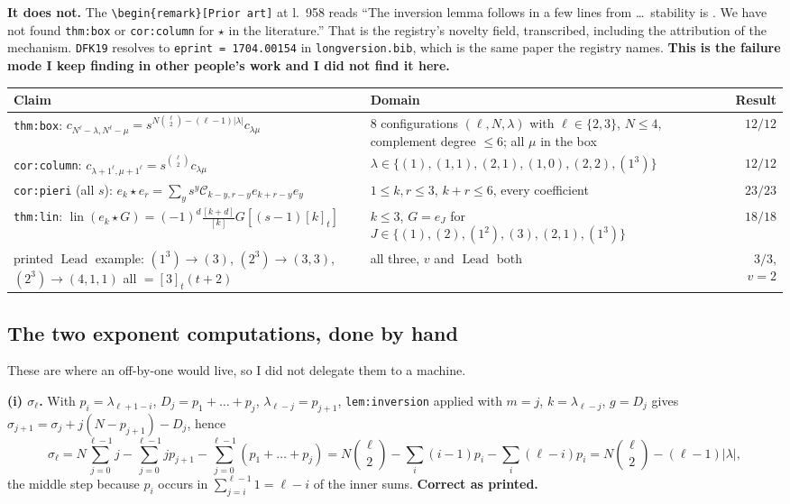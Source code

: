\documentclass[11pt]{article}
\newcommand{\val}{v}
\newcommand{\Lead}{\operatorname{Lead}}
\newcommand{\lin}{\operatorname{lin}}
\begin{document}
\textbf{It does not.} The \verb|\begin{remark}[Prior art]| at l.~958 reads
``The inversion lemma follows in a few lines from \cite[Rem.~3.3]{DFK19} \dots\ stability is
\cite[Prop.~3.8, Cor.~3.10]{Hikita25}. We have not found \texttt{thm:box} or \texttt{cor:column} for
$\star$ in the literature.'' That is the registry's novelty field, transcribed, including the
attribution of the mechanism. \texttt{DFK19} resolves to \texttt{eprint = 1704.00154} in
\texttt{longversion.bib}, which is the same paper the registry names. \textbf{This is the failure mode
I keep finding in other people's work and I did not find it here.}

\begin{center}\small
\begin{tabular}{@{}p{}p{}r@{}}
\toprule
\textbf{Claim} & \textbf{Domain} & \textbf{Result}\\
\midrule
\texttt{thm:box}: $c_{N^\ell-\lambda,N^\ell-\mu}=s^{N\binom\ell2-(\ell-1)|\lambda|}c_{\lambda\mu}$
 & $8$ configurations $(\ell,N,\lambda)$ with $\ell\in\{2,3\}$, $N\le4$, complement degree $\le6$;
   all $\mu$ in the box & $12/12$\\
\texttt{cor:column}: $c_{\lambda+1^\ell,\mu+1^\ell}=s^{\binom\ell2}c_{\lambda\mu}$
 & $\lambda\in\{(1),(1,1),(2,1),(1,0),(2,2),(1^3)\}$ & $12/12$\\
\texttt{cor:pieri} (all $s$): $e_k\star e_r=\sum_ys^y\mathcal C_{k-y,r-y}e_{k+r-y}e_y$
 & $1\le k,r\le3$, $k+r\le6$, every coefficient & $23/23$\\
\texttt{thm:lin}: $\lin(e_k\star G)=(-1)^d\frac{[k+d]}{[k]}G[(s-1)[k]_t]$
 & $k\le3$, $G=e_J$ for $J\in\{(1),(2),(1^2),(3),(2,1),(1^3)\}$ & $18/18$\\
printed $\Lead$ example: $(1^3)\to(3)$, $(2^3)\to(3,3)$, $(2^3)\to(4,1,1)$ all $=[3]_t(t+2)$
 & all three, $\val$ and $\Lead$ both & $3/3$, $\val=2$\\
\bottomrule
\end{tabular}
\end{center}

\subsection{The two exponent computations, done by hand}

These are where an off-by-one would live, so I did not delegate them to a machine.

\textbf{(i) $\sigma_\ell$.} With $p_i=\lambda_{\ell+1-i}$, $D_j=p_1+\dots+p_j$,
$\lambda_{\ell-j}=p_{j+1}$, \texttt{lem:inversion} applied with $m=j$, $k=\lambda_{\ell-j}$, $g=D_j$
gives $\sigma_{j+1}=\sigma_j+j(N-p_{j+1})-D_j$, hence
\[ \sigma_\ell=N\!\!\sum_{j=0}^{\ell-1}\!j-\sum_{j=0}^{\ell-1}jp_{j+1}-\sum_{j=0}^{\ell-1}(p_1+\dots+p_j)
 =N\binom\ell2-\sum_i(i-1)p_i-\sum_i(\ell-i)p_i=N\binom\ell2-(\ell-1)|\lambda|, \]
the middle step because $p_i$ occurs in $\sum_{j=i}^{\ell-1}1=\ell-i$ of the inner sums.
\textbf{Correct as printed.}
\end{document}
